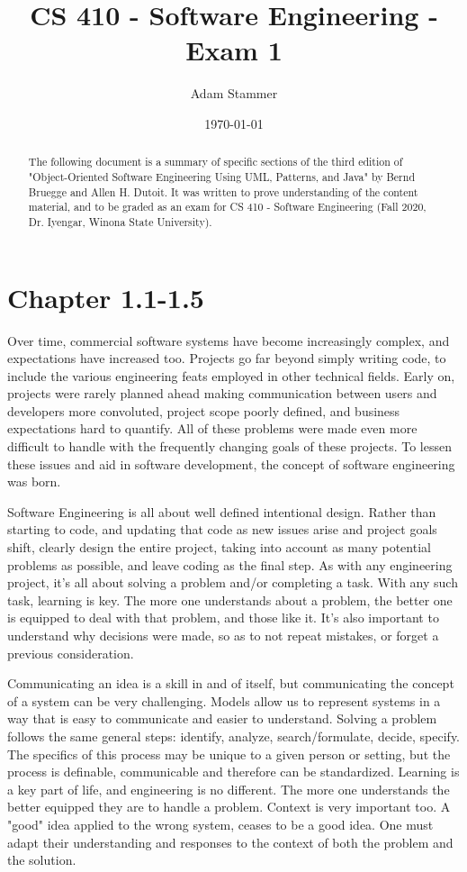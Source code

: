 \documentclass[prb,preprint]{revtex4-2}
\begin{document}
\title{CS 410 - Software Engineering - Exam 1}
\author{Adam Stammer}

\date{\today}

\begin{abstract}
	The following document is a summary of specific sections of the third edition of "Object-Oriented Software Engineering Using UML, Patterns, and Java" by Bernd Bruegge and Allen H. Dutoit. It was written to prove understanding of the content material, and to be graded as an exam for CS 410 - Software Engineering (Fall 2020, Dr. Iyengar, Winona State University).
\end{abstract}

\maketitle

\section*{Chapter 1.1-1.5}
Over time, commercial software systems have become increasingly complex, and expectations have increased too. Projects go far beyond simply writing code, to include the various engineering feats employed in other technical fields. Early on, projects were rarely planned ahead making communication between users and developers more convoluted, project scope poorly defined, and business expectations hard to quantify. All of these problems were made even more difficult to handle with the frequently changing goals of these projects. To lessen these issues and aid in software development, the concept of software engineering was born.

Software Engineering is all about well defined intentional design. Rather than starting to code, and updating that code as new issues arise and project goals shift, clearly design the entire project, taking into account as many potential problems as possible, and leave coding as the final step. As with any engineering project, it's all about solving a problem and/or completing a task. With any such task, learning is key. The more one understands about a problem, the better one is equipped to deal with that problem, and those like it. It's also important to understand why decisions were made, so as to not repeat mistakes, or forget a previous consideration. 

Communicating an idea is a skill in and of itself, but communicating the concept of a system can be very challenging. Models allow us to represent systems in a way that is easy to communicate and easier to understand. Solving a problem follows the same general steps: identify, analyze, search/formulate, decide, specify. The specifics of this process may be unique to a given person or setting, but the process is definable, communicable and therefore can be standardized. Learning is a key part of life, and engineering is no different. The more one understands the better equipped they are to handle a problem. Context is very important too. A "good" idea applied to the wrong system, ceases to be a good idea. One must adapt their understanding and responses to the context of both the problem and the solution.
\end{document}
